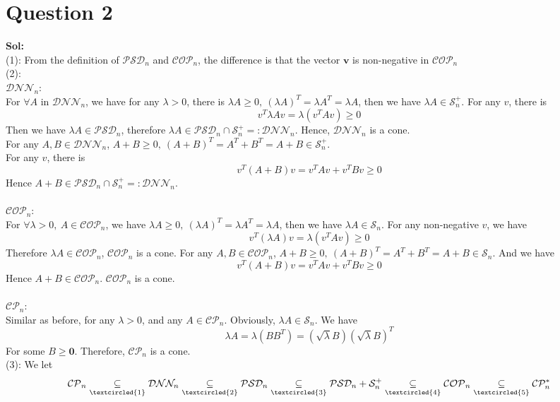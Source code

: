 \documentclass[11pt,a4paper]{article}
\begin{document}
\section*{Question 2}
\textbf{Sol:}\\
(1): From the definition of $\mathcal{PSD}_{n}$ and $\mathcal{COP}_{n}$, the difference is that the vector $\textbf{v}$ is non-negative in $\mathcal{COP}_{n}$\\
(2):\\ $\mathcal{DNN}_{n}$: \\
For $\forall A \text{ in } \mathcal{DNN}_{n}$, we have for any $\lambda>0$, there is $\lambda A\geq 0,\ (\lambda A)^{T}=\lambda A^{T}=\lambda A$, then we have $\lambda A\in \mathcal{S}^{+}_{n}$. For any $v$, there is $$v^{T}\lambda Av = \lambda(v^{T}Av)\geq 0$$
Then we have $\lambda A\in \mathcal{PSD}_{n}$, therefore $\lambda A \in \mathcal{PSD}_{n}\cap\mathcal{S}^{+}_{n}=:\mathcal{DNN}_{n}$. Hence, $\mathcal{DNN}_{n}$ is a cone.\\
For any $A,B\in \mathcal{DNN}_{n}$, $A+B\geq0,\ (A+B)^{T}=A^{T}+B^{T}=A+B\in \mathcal{S}_{n}^{+}$.\\
For any $v$, there is $$v^{T}(A+B)v=v^{T}Av+v^{T}Bv\geq 0$$ Hence $A+B\in \mathcal{PSD}_{n}\cap\mathcal{S}^{+}_{n}=:\mathcal{DNN}_{n}$.\\ \\ 
$\mathcal{COP}_{n}$:\\
For $\forall \lambda>0,\ A \in \mathcal{COP}_{n}$, we have $\lambda A\geq 0,\ (\lambda A)^{T}=\lambda A^{T}=\lambda A$, then we have $\lambda A\in \mathcal{S}_{n}$. For any non-negative $v$, we have $$v^{T}(\lambda A)v=\lambda (v^{T}Av)\geq0$$Therefore $\lambda A\in \mathcal{COP}_{n}$, $\mathcal{COP}_{n}$ is a cone.
For any $A,B\in \mathcal{COP}_{n}$, $A+B\geq0,\ (A+B)^{T}=A^{T}+B^{T}=A+B\in \mathcal{S}_{n}$. And we have $$v^{T}(A+B)v=v^{T}Av+v^{T}Bv\geq 0$$
Hence $A+B\in \mathcal{COP}_{n}$. $\mathcal{COP}_{n}$ is a cone.\\ \\
$\mathcal{CP}_{n}$:\\
Similar as before, for any $\lambda>0$, and any $A \in \mathcal{CP}_{n}$. Obviously, $\lambda A\in \mathcal{S}_{n}$. We have $$\lambda A = \lambda (BB^{T})=(\sqrt{\lambda}B)(\sqrt{\lambda}B)^{T}$$ For some $B \geq \mathbf{0}$. Therefore, $\mathcal{CP}_{n}$ is a cone.\\
(3): We let
$$\mathcal{C P}_{n} \underset{\textcircled{1}}{\subseteq} \mathcal{D} \mathcal{N} \mathcal{N}_{n} \underset{\textcircled{2}}{\subseteq} \mathcal{P} \mathcal{S} \mathcal{D}_{n} \underset{\textcircled{3}}{\subseteq} \mathcal{P} \mathcal{S} \mathcal{D}_{n}+\mathcal{S}_{n}^{+} \underset{\textcircled{4}}{\subseteq} \mathcal{C O P}_{n} \underset{\textcircled{5}}{\subseteq} \mathcal{C} \mathcal{P}_{n}^{*}$$
\end{document}
